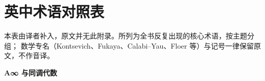 
\appendix
\section{英中术语对照表}
\label{app:glossary}

本表由译者补入，原文并无此附录。所列为全书反复出现的核心术语，按主题分组；
数学专名（Kontsevich、Fukaya、Calabi--Yau、Floer 等）与记号一律保留原文，不作音译。

\vspace{0.6em}
\noindent\textbf{A∞ 与同调代数}\par\nobreak
\vspace{0.3em}
